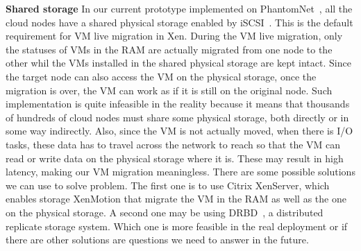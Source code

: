 \textbf{Shared storage} In our current prototype implemented on PhantomNet~\cite{phantomnet}, all the cloud nodes have a shared physical storage enabled by iSCSI~\cite{iscsi}. This is the default requirement for VM live migration in Xen. During the VM live migration, only the statuses of VMs in the RAM are actually migrated from one node to the other whil the VMs installed in the shared physical storage are kept intact. Since the target node can also access the VM on the physical storage, once the migration is over, the VM can work as if it is still on the original node. Such implementation is quite infeasible in the reality because it means that thousands of hundreds of cloud nodes must share some physical storage, both directly or in some way indirectly. Also, since the VM is not actually moved, when there is I/O tasks, these data has to travel across the network to reach so that the VM can read or write data on the physical storage where it is. These may result in high latency, making our VM migration meaningless. There are some possible solutions we can use to solve problem. The first one is to use Citrix XenServer, which enables storage XenMotion that migrate the VM in the RAM as well as the one on the physical storage. A second one may be using DRBD~\cite{drbd}, a distributed replicate storage system. Which one is more feasible in the real deployment or if there are other solutions are questions we need to answer in the future.

